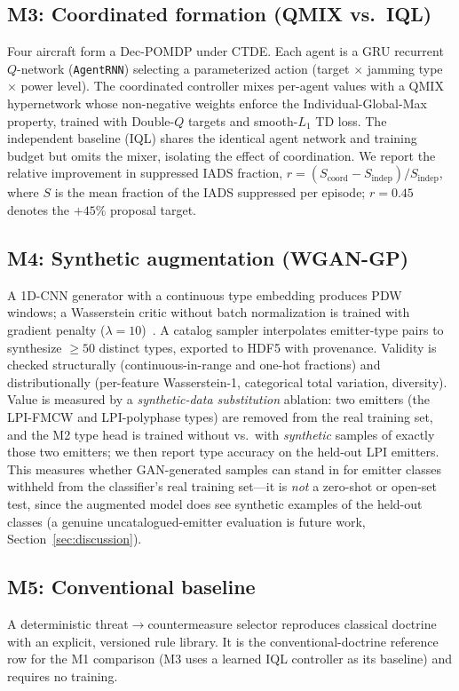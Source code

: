 \documentclass[journal]{IEEEtran}
\begin{document}
\subsection{M3: Coordinated formation (QMIX vs.\ IQL)}
Four aircraft form a Dec-POMDP under CTDE. Each agent is a GRU recurrent $Q$-network
(\texttt{AgentRNN}) selecting a parameterized action (target $\times$ jamming type $\times$ power
level). The coordinated controller mixes per-agent values with a QMIX hypernetwork whose
non-negative weights enforce the Individual-Global-Max property, trained with Double-$Q$ targets
and smooth-$L_1$ TD loss. The independent baseline (IQL) shares the identical agent network and
training budget but omits the mixer, isolating the effect of coordination. We report the
relative improvement in suppressed IADS fraction, $r = (S_\text{coord} - S_\text{indep}) /
S_\text{indep}$, where $S$ is the mean fraction of the IADS suppressed per episode; $r = 0.45$
denotes the $+45\%$ proposal target.

\subsection{M4: Synthetic augmentation (WGAN-GP)}
A 1D-CNN generator with a continuous type embedding produces PDW windows; a Wasserstein critic
without batch normalization is trained with gradient penalty
($\lambda{=}10$)~\cite{gulrajani2017wgangp}. A catalog sampler
interpolates emitter-type pairs to synthesize $\ge 50$ distinct types, exported to HDF5 with
provenance. Validity is checked structurally (continuous-in-range and one-hot fractions) and
distributionally (per-feature Wasserstein-1, categorical total variation, diversity). Value is
measured by a \emph{synthetic-data substitution} ablation: two emitters (the LPI-FMCW and
LPI-polyphase types) are removed from the real training set, and the M2 type head is trained
without vs.\ with \emph{synthetic} samples of exactly those two emitters; we then report type
accuracy on the held-out LPI emitters. This measures whether GAN-generated samples can stand in
for emitter classes withheld from the classifier's real training set---it is \emph{not} a
zero-shot or open-set test, since
the augmented model does see synthetic examples of the held-out classes (a genuine
uncatalogued-emitter evaluation is future work, Section~\ref{sec:discussion}).

\subsection{M5: Conventional baseline}
A deterministic threat$\to$countermeasure selector reproduces classical doctrine with an
explicit, versioned rule library. It is the conventional-doctrine reference row for the M1
comparison (M3 uses a learned IQL controller as its baseline) and requires no training.
\end{document}
